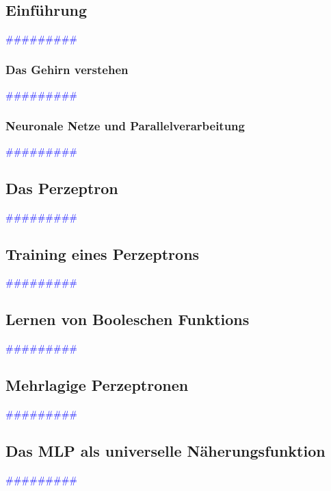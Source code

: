 \documentclass{article}
\begin{document}
  \subsection{Einführung} %
      \textcolor{blue}{\#\#\#\#\#\#\#\#\#}
    \subsubsection{Das Gehirn verstehen} %
      \textcolor{blue}{\#\#\#\#\#\#\#\#\#}
    \subsubsection{Neuronale Netze und Parallelverarbeitung} %
      \textcolor{blue}{\#\#\#\#\#\#\#\#\#}
  \subsection{Das Perzeptron} %
      \textcolor{blue}{\#\#\#\#\#\#\#\#\#}
  \subsection{Training eines Perzeptrons} %
      \textcolor{blue}{\#\#\#\#\#\#\#\#\#}
  \subsection{Lernen von Booleschen Funktions} %
      \textcolor{blue}{\#\#\#\#\#\#\#\#\#}
  \subsection{Mehrlagige Perzeptronen} %
      \textcolor{blue}{\#\#\#\#\#\#\#\#\#}
  \subsection{Das MLP als universelle Näherungsfunktion} %
      \textcolor{blue}{\#\#\#\#\#\#\#\#\#}
\end{document}
